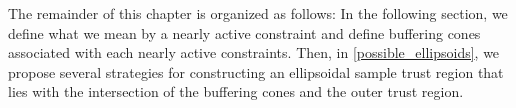 %




The remainder of this chapter is organized as follows:   In the following section, we define what we mean by a nearly active constraint and define buffering cones associated with each nearly active constraints.  Then, in \cref{possible_ellipsoids}, we propose several strategies for constructing an ellipsoidal sample trust region that lies with the intersection of the buffering cones and the outer trust region.   


